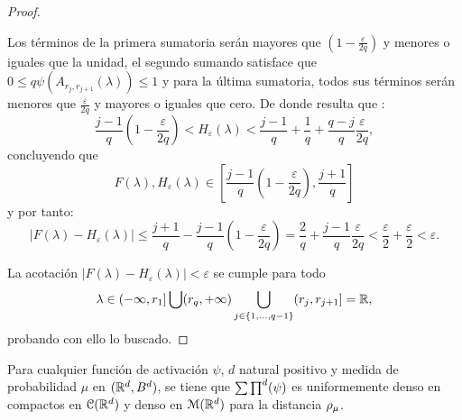 \begin{proof}
\begin{itemize}
        Los términos de la primera sumatoria serán mayores que $\left(1-\frac{\varepsilon}{2q} \right)$ y menores o iguales que la unidad, 
        el segundo sumando satisface que 
        $0 \leq q\psi( A_{r_j, r_{j+1}}(\lambda)) \leq 1$
        y para la última sumatoria, todos sus términos serán menores que $\frac{\varepsilon}{2q}$ y mayores o iguales que cero.
        De donde resulta que : 
        \begin{equation}
            \frac{j-1}{q}\left(1-\frac{\varepsilon}{2q} \right)  
            <
            H_\varepsilon(\lambda) 
            <
            \frac{j-1}{q} 
            + 
            \frac{1}{q} 
            + 
            \frac{q-j}{q} \frac{\varepsilon}{2q} ,
        \end{equation}
        concluyendo que 
        \begin{equation}
            F(\lambda), H_\varepsilon(\lambda) 
            \in 
            \left[
                \frac{j-1}{q}\left(1-\frac{\varepsilon}{2q}\right),
                \frac{j+1}{q}
            \right]
        \end{equation}
        y por tanto: 
        \begin{equation}
            | F(\lambda) - H_{\varepsilon}(\lambda) | 
            \leq \frac{j+1}{q} -  \frac{j-1}{q}\left(1-\frac{\varepsilon}{2q}\right)
            = 
            \frac{2}{q} + \frac{j-1}{q}\frac{\varepsilon}{2q}
            < \frac{\varepsilon}{2} + \frac{\varepsilon}{2}
            < \varepsilon.
        \end{equation}
    \end{itemize}
    La acotación $| F(\lambda) - H_{\varepsilon}(\lambda) | < \varepsilon$ se cumple para todo
    \begin{equation}
        \lambda \in (- \infty, r_1]
         \bigcup (r_q,+\infty) 
        \bigcup_{j \in \{1, ..., q-1\}} (r_{j},r_{j+1}] = \mathbb{R},
    \end{equation}
    probando con ello lo buscado.
\end{proof}      

\begin{teorema}\label{teorema:2_3_uniformemente_denso_compactos}
    Para cualquier función de activación $\psi$, $d$ natural positivo y
    medida de probabilidad $\mu$ en $(\mathbb{R}^d, B^d)$, 
    se tiene que $\sum \prod^d (\psi)$ es uniformemente denso en compactos
    en $\mathcal{C}(\mathbb{R}^d)$ y denso en $\mathcal{M}(\mathbb{R}^d)$ para la distancia $\rho_{\mu}$. 
\end{teorema}

